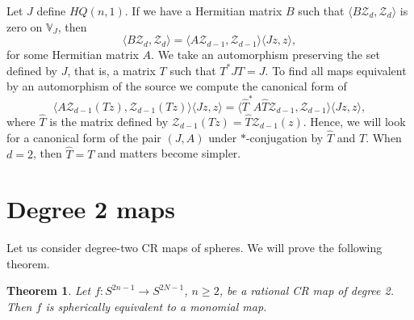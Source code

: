 \documentclass[12pt,openany]{book}
\newcommand{\bV}{{\mathbb{V}}}
\newcommand{\sZ}{{\mathcal{Z}}}
\newcommand{\sectionnewpage}{}
\theoremstyle{plain}
\newtheorem{thm}{Theorem}[section]
\theoremstyle{remark}
\theoremstyle{definition}
\theoremstyle{exercise}
\theoremstyle{example}
\begin{document}
Let $J$ define $HQ(n,1)$.
If we have a Hermitian matrix $B$ such that $\langle B \sZ_d , \sZ_d \rangle$ 
is zero on $\bV_J$, then
\begin{equation}
\langle B \sZ_d , \sZ_d \rangle =
\langle A \sZ_{d-1} , \sZ_{d-1} \rangle
\langle J z , z \rangle ,
\end{equation}
for some Hermitian matrix $A$.  We take an automorphism preserving the set
defined by $J$, that is, a matrix $T$ such that $T^* J T = J$.  To find all maps
equivalent by an automorphism of the source we compute the canonical form of
\begin{equation}
\langle A \sZ_{d-1} (Tz) , \sZ_{d-1} (Tz) \rangle
\langle J z , z \rangle
=
\langle \hat{T}^* A \hat{T} \sZ_{d-1} , \sZ_{d-1} \rangle
\langle J z , z \rangle ,
\end{equation}
where $\hat{T}$ is the matrix defined by $\sZ_{d-1}(Tz) = \hat{T} \sZ_{d-1}(z)$.
Hence, we will look for a canonical form of the pair $(J,A)$ under $*$-conjugation
by $\hat{T}$ and $T$.
When $d=2$, then $\hat{T} = T$ and matters become simpler.



\sectionnewpage
\section{Degree 2 maps}

Let us consider degree-two CR maps of spheres.
We will prove the following theorem.

\begin{thm}
Let $f \colon S^{2n-1} \to S^{2N-1}$, $n \geq 2$, be a rational CR map
of degree 2.  Then $f$ 
is spherically equivalent to a monomial map.
\end{thm}
\end{document}
